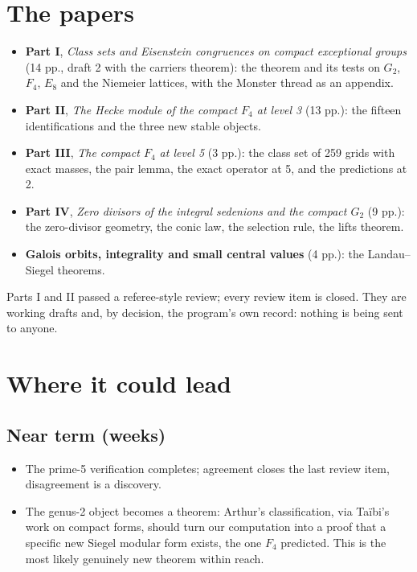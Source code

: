 \documentclass[11pt]{article}
\begin{document}
\section{The papers}
\begin{itemize}[nosep]
\item \textbf{Part I}, \emph{Class sets and Eisenstein congruences on compact exceptional groups} (14 pp., draft 2 with the carriers theorem): the theorem and its tests on $G_2$, $F_4$, $E_8$ and the Niemeier lattices, with the Monster thread as an appendix.
\item \textbf{Part II}, \emph{The Hecke module of the compact $F_4$ at level 3} (13 pp.): the fifteen identifications and the three new stable objects.
\item \textbf{Part III}, \emph{The compact $F_4$ at level 5} (3 pp.): the class set of 259 grids with exact masses, the pair lemma, the exact operator at 5, and the predictions at 2.
\item \textbf{Part IV}, \emph{Zero divisors of the integral sedenions and the compact $G_2$} (9 pp.): the zero-divisor geometry, the conic law, the selection rule, the lifts theorem.
\item \textbf{Galois orbits, integrality and small central values} (4 pp.): the Landau--Siegel theorems.
\end{itemize}
Parts I and II passed a referee-style review; every review item is closed. They are working drafts and, by decision, the program's own record: nothing is being sent to anyone.

\section{Where it could lead}
\subsection{Near term (weeks)}
\begin{itemize}[nosep]
\item The prime-5 verification completes; agreement closes the last review item, disagreement is a discovery.
\item The genus-2 object becomes a theorem: Arthur's classification, via Ta\"ibi's work on compact forms, should turn our computation into a proof that a specific new Siegel modular form exists, the one $F_4$ predicted. This is the most likely genuinely new theorem within reach.

\end{itemize}
\end{document}
